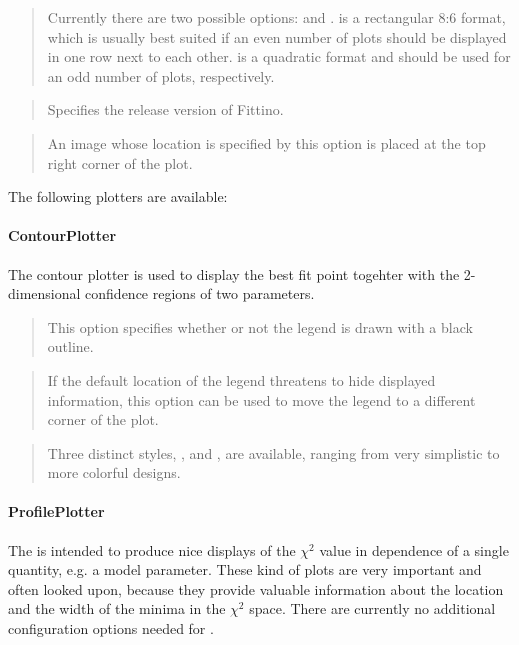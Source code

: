 \documentclass[letterpaper,10pt,english]{sphinxmanual}
\begin{document}
\begin{quote}

Currently there are two possible options:  and .  is a
rectangular 8:6 format, which is usually best suited if an even number of plots should be
displayed in one row next to each other.  is a quadratic format and should be used for
an odd number of plots, respectively.
\end{quote}

\begin{quote}

Specifies the release version of Fittino.
\end{quote}

\begin{quote}

An image whose location is specified by this option is placed at the top right corner of the
plot.
\end{quote}

The following plotters are available:


\paragraph{ContourPlotter}
\label{contour_plotter:contourplotter}\label{contour_plotter::doc}
The contour plotter is used to display the best fit point togehter with the 2-dimensional confidence
regions of two parameters.

\begin{quote}

This option specifies whether or not the legend is drawn with a black outline.
\end{quote}

\begin{quote}

If the default  location of the legend threatens to hide displayed information,
this option can be used to move the legend to a different corner of the plot.
\end{quote}

\begin{quote}

Three distinct styles, ,  and , are available, ranging from very
simplistic to more colorful designs.
\end{quote}


\paragraph{ProfilePlotter}
\label{profile_plotter:profileplotter}\label{profile_plotter::doc}
The  is intended to produce nice displays of the \(\chi^2\) value in
dependence of a single quantity, e.g. a model parameter. These kind of plots are very important and
often looked upon, because they provide valuable information about the location and the width of the
minima in the \(\chi^2\) space. There are currently no additional configuration options needed
for .
\end{document}
